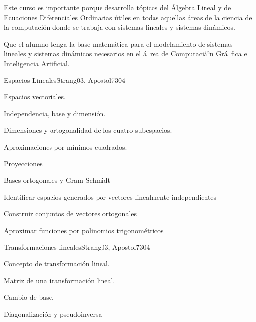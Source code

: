 \begin{syllabus}


\begin{justification}
Este curso es importante porque desarrolla tópicos del Álgebra Lineal y de Ecuaciones Diferenciales Ordinarias útiles en todas aquellas áreas de la ciencia de la computación donde se trabaja con sistemas lineales y sistemas dinámicos.
\end{justification}

\begin{goals}
\item Que el alumno tenga la base matemática para el modelamiento de sistemas lineales y sistemas dinámicos necesarios en el á rea de Computaciá²n Grá fica e Inteligencia Artificial.
\end{goals}

\begin{outcomes}
\end{outcomes}

\begin{unit}{Espacios Lineales}{Strang03, Apostol73}{0}{4}
\begin{topics}
      \item Espacios vectoriales.
      \item Independencia, base y dimensión.
      \item Dimensiones y ortogonalidad de los cuatro subespacios.
      \item Aproximaciones por mínimos cuadrados.
      \item Proyecciones
      \item Bases ortogonales y Gram-Schmidt
   \end{topics}

   \begin{learningoutcomes}
      \item Identificar espacios generados por vectores linealmente independientes
      \item Construir conjuntos de vectores ortogonales
      \item Aproximar funciones por polinomios trigonométricos
   \end{learningoutcomes}
\end{unit}

\begin{unit}{Transformaciones lineales}{Strang03, Apostol73}{0}{4}
\begin{topics}
      \item Concepto de transformación lineal.
      \item Matriz de una transformación lineal.
      \item Cambio de base.
      \item Diagonalización y pseudoinversa
   \end{topics}


\end{unit}
\end{syllabus}
